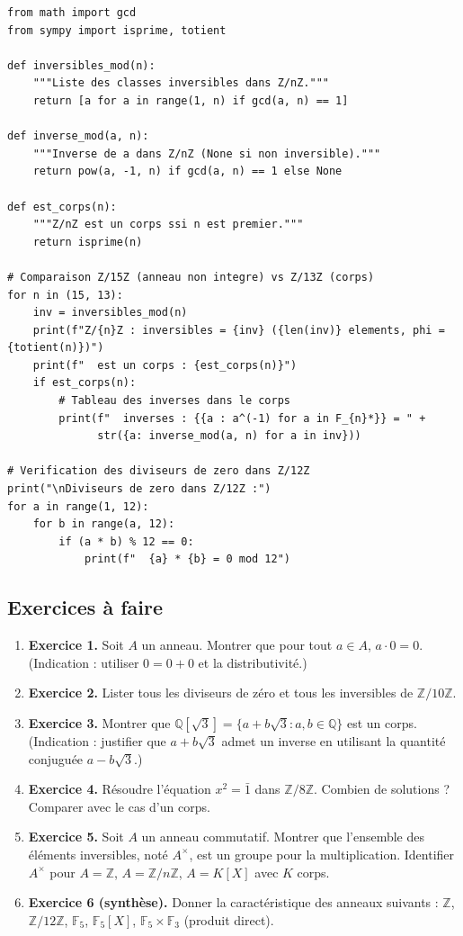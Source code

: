 \documentclass[12pt,a4paper]{report}
\theoremstyle{definition}
\theoremstyle{remark}
\begin{document}
\begin{lstlisting}
from math import gcd
from sympy import isprime, totient

def inversibles_mod(n):
    """Liste des classes inversibles dans Z/nZ."""
    return [a for a in range(1, n) if gcd(a, n) == 1]

def inverse_mod(a, n):
    """Inverse de a dans Z/nZ (None si non inversible)."""
    return pow(a, -1, n) if gcd(a, n) == 1 else None

def est_corps(n):
    """Z/nZ est un corps ssi n est premier."""
    return isprime(n)

# Comparaison Z/15Z (anneau non integre) vs Z/13Z (corps)
for n in (15, 13):
    inv = inversibles_mod(n)
    print(f"Z/{n}Z : inversibles = {inv} ({len(inv)} elements, phi = {totient(n)})")
    print(f"  est un corps : {est_corps(n)}")
    if est_corps(n):
        # Tableau des inverses dans le corps
        print(f"  inverses : {{a : a^(-1) for a in F_{n}*}} = " +
              str({a: inverse_mod(a, n) for a in inv}))

# Verification des diviseurs de zero dans Z/12Z
print("\nDiviseurs de zero dans Z/12Z :")
for a in range(1, 12):
    for b in range(a, 12):
        if (a * b) % 12 == 0:
            print(f"  {a} * {b} = 0 mod 12")
\end{lstlisting}

\subsection{Exercices à faire}
\begin{enumerate}
    \item \textbf{Exercice 1.} Soit $A$ un anneau. Montrer que pour tout $a \in A$, $a \cdot 0 = 0$. (Indication : utiliser $0 = 0 + 0$ et la distributivité.)
    \item \textbf{Exercice 2.} Lister tous les diviseurs de zéro et tous les inversibles de $\mathbb{Z}/10\mathbb{Z}$.
    \item \textbf{Exercice 3.} Montrer que $\mathbb{Q}[\sqrt{3}] = \{a + b\sqrt{3} : a, b \in \mathbb{Q}\}$ est un corps. (Indication : justifier que $a + b\sqrt{3}$ admet un inverse en utilisant la quantité conjuguée $a - b\sqrt{3}$.)
    \item \textbf{Exercice 4.} Résoudre l'équation $x^2 = \bar{1}$ dans $\mathbb{Z}/8\mathbb{Z}$. Combien de solutions ? Comparer avec le cas d'un corps.
    \item \textbf{Exercice 5.} Soit $A$ un anneau commutatif. Montrer que l'ensemble des éléments inversibles, noté $A^\times$, est un groupe pour la multiplication. Identifier $A^\times$ pour $A = \mathbb{Z}$, $A = \mathbb{Z}/n\mathbb{Z}$, $A = K[X]$ avec $K$ corps.
    \item \textbf{Exercice 6 (synthèse).} Donner la caractéristique des anneaux suivants : $\mathbb{Z}$, $\mathbb{Z}/12\mathbb{Z}$, $\mathbb{F}_5$, $\mathbb{F}_5[X]$, $\mathbb{F}_5 \times \mathbb{F}_3$ (produit direct).
\end{enumerate}
\end{document}
